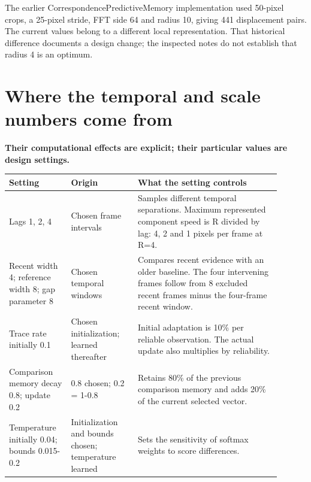 \documentclass[11pt,letterpaper]{article}
\begin{document}
The earlier CorrespondencePredictiveMemory implementation used 50-pixel crops, a 25-pixel stride, FFT side 64 and radius 10, giving 441 displacement pairs. The current values belong to a different local representation. That historical difference documents a design change; the inspected notes do not establish that radius 4 is an optimum.


\clearpage

\section{Where the temporal and scale numbers come from}\label{sec20}

\textbf{Their computational effects are explicit; their particular values are design settings.}


\begin{center}\small\renewcommand{\arraystretch}{1.16}\setlength{\tabcolsep}{4pt}\begin{tabular}{p{0.206\linewidth}p{0.224\linewidth}p{0.470\linewidth}}\toprule

\textbf{Setting} & \textbf{Origin} & \textbf{What the setting controls} \\

\midrule

Lags 1, 2, 4 & Chosen frame intervals & Samples different temporal separations. Maximum represented component speed is R divided by lag: 4, 2 and 1 pixels per frame at R=4. \\

Recent width 4; reference width 8; gap parameter 8 & Chosen temporal windows & Compares recent evidence with an older baseline. The four intervening frames follow from 8 excluded recent frames minus the four-frame recent window. \\

Trace rate initially 0.1 & Chosen initialization; learned thereafter & Initial adaptation is 10\% per reliable observation. The actual update also multiplies by reliability. \\

Comparison memory decay 0.8; update 0.2 & 0.8 chosen; 0.2 = 1-0.8 & Retains 80\% of the previous comparison memory and adds 20\% of the current selected vector. \\

Temperature initially 0.04; bounds 0.015-0.2 & Initialization and bounds chosen; temperature learned & Sets the sensitivity of softmax weights to score differences. \\


\end{tabular}
\end{center}
\end{document}
